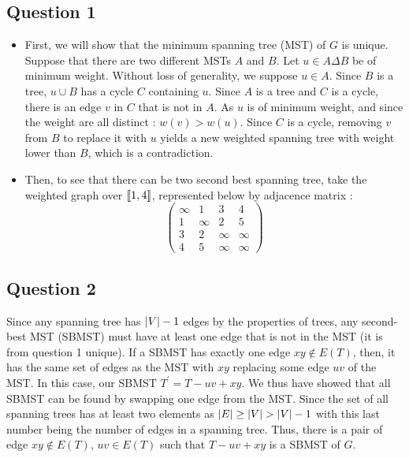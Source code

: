 \documentclass{cours}
\begin{document}
\subsection{Question 1}
\begin{itemize}
    \item First, we will show that the minimum spanning tree (MST) of $G$ is unique. Suppose that there are two different MSTs $A$ and $B$. Let $u \in A \Delta B$ be of minimum weight. Without loss of generality, we suppose $u \in A$. Since $B$ is a tree, $u \cup B$ has a cycle $C$ containing $u$. Since $A$ is a tree and $C$ is a cycle, there is an edge $v$ in $C$ that is not in $A$. As $u$ is of minimum weight, and since the weight are all distinct : $w(v) > w(u)$. Since $C$ is a cycle, removing $v$ from $B$ to replace it with $u$ yields a new weighted spanning tree with weight lower than $B$, which is a contradiction.
    \item Then, to see that there can be two second best spanning tree, take the weighted graph over $\left\llbracket 1, 4\right\rrbracket$, represented below by adjacence matrix :
          \[
              \left(\begin{matrix}
                  \infty & 1      & 3      & 4      \\
                  1      & \infty & 2      & 5      \\
                  3      & 2      & \infty & \infty \\
                  4      & 5      & \infty & \infty
              \end{matrix}\right)
          \]
\end{itemize}

\subsection{Question 2}
Since any spanning tree has $\left|V\right| - 1$ edges by the properties of trees, any second-best MST (SBMST) must have at least one edge that is not in the MST (it is from question 1 unique). If a SBMST has exactly one edge $xy \notin E(T)$, then, it has the same set of edges as the MST with $xy$ replacing some edge $uv$ of the MST. In this case, our SBMST $T^{'} = T - uv + xy$. We thus have showed that all SBMST can be found by swapping one edge from the MST. Since the set of all spanning trees has at least two elements as $\left|E\right| \geq \left|V\right| > \left|V\right| - 1$ with this last number being the number of edges in a spanning tree. Thus, there is a pair of edge $xy \notin E(T)$, $uv \in E(T)$ such that $T - uv + xy$ is a SBMST of $G$. 
\end{document}
